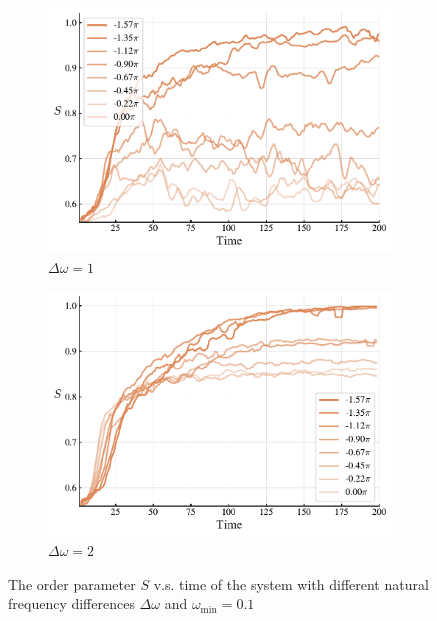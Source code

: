 \documentclass{article}
\begin{document}
\begin{figure}
    \centering
    \begin{subfigure}{0.45\textwidth}
        \centering
        \includegraphics[width=1\textwidth]{figs/S_l0.15_d0.5_dO1_S.pdf}
        \caption{$\Delta \omega=1$}
    \end{subfigure}
    \begin{subfigure}{0.45\textwidth}
        \centering
        \includegraphics[width=1\textwidth]{figs/S_l0.15_d0.5_dO2_S.pdf}
        \caption{$\Delta \omega=2$}
    \end{subfigure}
    \caption{The order parameter $S$ v.s. time of the system with different natural frequency differences $\Delta \omega$ and $\omega_{\min}=0.1$}
\end{figure}
\end{document}

